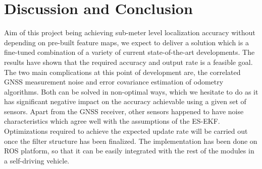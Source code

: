 \chapter{Discussion and Conclusion}
Aim of this project being achieving sub-meter level localization accuracy without depending on pre-built feature maps, we expect to deliver a solution which is a fine-tuned combination of a variety of current state-of-the-art developments. The results have shown that the required accuracy and output rate is a feasible goal. The two main complications at this point of development are, the correlated \gls{GNSS} measurement noise and error covariance estimation of odometry algorithms. Both can be solved in non-optimal ways, which we hesitate to do as it has significant negative impact on the accuracy achievable using a given set of sensors. Apart from the \gls{GNSS} receiver, other sensors happened to have noise characteristics which agree well with the assumptions of the \gls{ES-EKF}. Optimizations required to achieve the expected update rate will be carried out once the filter structure has been finalized. The implementation has been done on \gls{ROS} platform, so that it can be easily integrated with the rest of the modules in a self-driving vehicle.



